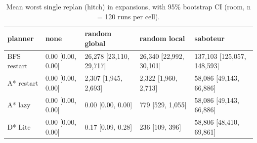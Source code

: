 \begin{table}[t]
\centering
\small
\caption{Mean worst single replan (hitch) in expansions, with 95\% bootstrap CI (room, n = 120 runs per cell).}
\label{tab:hitch-room}
\begin{tabular}{lllll}
\toprule
planner & none & random global & random local & saboteur \\
\midrule
BFS restart & 0.00 [0.00, 0.00] & 26,278 [23,110, 29,717] & 26,340 [22,992, 30,101] & 137,103 [125,057, 148,593] \\
A* restart & 0.00 [0.00, 0.00] & 2,307 [1,945, 2,693] & 2,322 [1,960, 2,713] & 58,086 [49,143, 66,886] \\
A* lazy & 0.00 [0.00, 0.00] & 0.00 [0.00, 0.00] & 779 [529, 1,055] & 58,086 [49,143, 66,886] \\
D* Lite & 0.00 [0.00, 0.00] & 0.17 [0.09, 0.28] & 236 [109, 396] & 58,806 [48,410, 69,861] \\
\bottomrule
\end{tabular}
\end{table}
